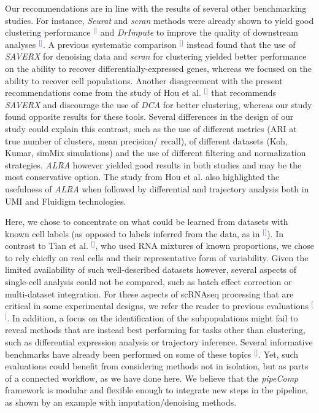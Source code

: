 \documentclass[11pt]{article}
\renewcommand{\cite}[1]{\textcolor{Blue}{$^[$\supercite{#1}$^]$}}
\begin{document}
Our recommendations are in line with the results of several other benchmarking studies. For instance, \textit{Seurat} and \textit{scran} methods were already shown to yield good clustering performance \cite{freytagComparison2018} and \textit{DrImpute} to improve the quality of downstream analyses \cite{ZhangImput2018}. A previous systematic comparison \cite{viethSystematic2019} instead found that the use of \textit{SAVERX} for denoising data and \textit{scran} for clustering yielded better performance on the ability to recover differentially-expressed genes, whereas we focused on the ability to recover cell populations. Another disagreement with the present recommendations come from the study of Hou et al. \cite{HouImput2020} that recommends \textit{SAVERX} and discourage the use of \textit{DCA} for better clustering, whereas our study found opposite results for these tools. Several differences in the design of our study could explain this contrast, such as the use of different metrics (ARI at true number of clusters, mean precision/ recall), of different datasets (Koh, Kumar, simMix simulations) and the use of different filtering and normalization strategies. \textit{ALRA} however yielded good results in both studies and may be the most conservative option. The study from Hou et al. also highlighted the usefulness of \textit{ALRA} when followed by differential and trajectory analysis both in UMI and Fluidigm technologies. 

Here, we chose to concentrate on what could be learned from datasets with known cell labels (as opposed to labels inferred from the data, as in \cite{MereuCellAtlas2019}). In contrast to Tian et al. \cite{tianMixology2018}, who used RNA mixtures of known proportions, we chose to rely chiefly on real cells and their representative form of variability. Given the limited availability of such well-described datasets however, several aspects of single-cell analysis could not be compared, such as batch effect correction or multi-dataset integration. For these aspects of scRNAseq processing that are critical in some experimental designs, we refer the reader to previous evaluations \cite{TranBatch2020, StuartIntegration2019}. In addition, a focus on the identification of the subpopulations might fail to reveal methods that are instead best performing for tasks other than clustering, such as differential expression analysis or trajectory inference. Several informative benchmarks have already been performed on some of these topics \cite{CrowellMuscat2019, DalMolinDE2017, JaakkolaDE2017, SaelensTraject2019, SonesonDE2018, WangDE2019}. Yet, such evaluations could benefit from considering methods not in isolation, but as parts of a connected workflow, as we have done here. We believe that the \textit{pipeComp} framework is modular and flexible enough to integrate new steps in the pipeline, as shown by an example with imputation/denoising methods.
\end{document}
